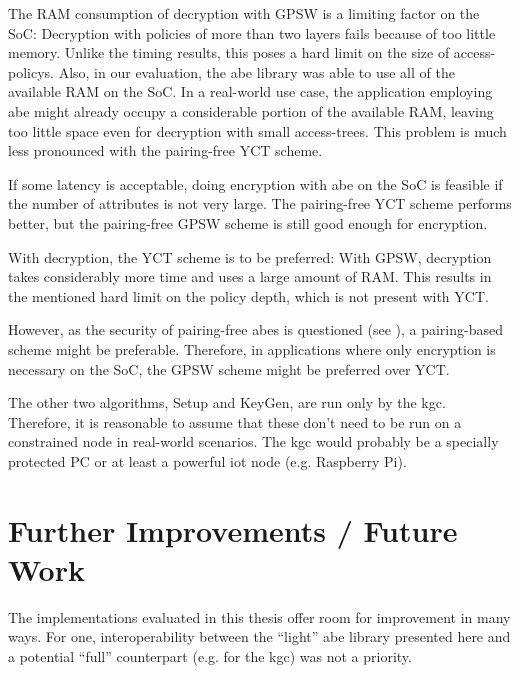 The RAM consumption of decryption with GPSW is a limiting factor on the SoC:
Decryption with policies of more than two layers fails because of too little memory.
Unlike the timing results, this poses a hard limit on the size of \glspl{access-policy}.
Also, in our evaluation, the \acrshort{abe} library was able to use all of the available RAM on the SoC.
In a real-world use case, the application employing \acrshort{abe} might already occupy a considerable portion of the available RAM, leaving too little space even for decryption with small \glspl{access-tree}.
This problem is much less pronounced with the pairing-free YCT scheme.

If some latency is acceptable, doing encryption with \acrshort{abe} on the SoC is feasible if the number of attributes is not very large.
The pairing-free YCT scheme performs better, but the pairing-free GPSW scheme is still good enough for encryption.

With decryption, the YCT scheme is to be preferred:
With GPSW, decryption takes considerably more time and uses a large amount of RAM.
This results in the mentioned hard limit on the policy depth, which is not present with YCT.

However, as the security of pairing-free \acrshort{abes} is questioned (see \cite{herranz_attacking_2020}), a pairing-based scheme might be preferable.
Therefore, in applications where only encryption is necessary on the SoC, the GPSW scheme might be preferred over YCT.

The other two algorithms, Setup and KeyGen, are run only by the \acrshort{kgc}.
Therefore, it is reasonable to assume that these don't need to be run on a constrained node in real-world scenarios.
The \acrshort{kgc} would probably be a specially protected PC or at least a powerful \acrshort{iot} node (e.g. Raspberry Pi).

\section{Further Improvements / Future Work}

The implementations evaluated in this thesis offer room for improvement in many ways.
For one, interoperability between the ``light'' \acrshort{abe} library presented here and a potential ``full'' counterpart (e.g. for the \acrshort{kgc}) was not a priority.

